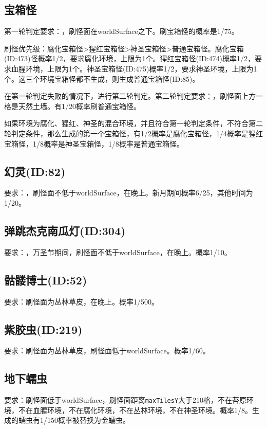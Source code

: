 \subsection{宝箱怪}
第一轮判定要求：，刷怪面在worldSurface之下。刷宝箱怪的概率是1/75。

刷怪优先级：腐化宝箱怪>猩红宝箱怪>神圣宝箱怪>普通宝箱怪。腐化宝箱(ID:473)怪概率1/2，要求腐化环境，上限为1个。猩红宝箱怪(ID:474)概率1/2，要求血腥环境，上限为1个。神圣宝箱怪(ID:475)概率1/2，要求神圣环境，上限为1个。这三个环境宝箱怪都不生成，则生成普通宝箱怪(ID:85)。

在第一轮判定失败的情况下，进行第二轮判定。第二轮判定要求：，刷怪面上方一格是天然土墙。有1/20概率刷普通宝箱怪。

\begin{remark}
如果环境为腐化、猩红、神圣的混合环境，并且符合第一轮判定条件，不符合第二轮判定条件，那么生成的第一个宝箱怪，有1/2概率是腐化宝箱怪，1/4概率是猩红宝箱怪，1/8概率是神圣宝箱怪，1/8概率是普通宝箱怪。
\end{remark}

\subsection{幻灵(ID:82)}
要求：，刷怪面不低于worldSurface，在晚上。新月期间概率6/25，其他时间为1/20。

\subsection{弹跳杰克南瓜灯(ID:304)}
要求：，万圣节期间，刷怪面不低于worldSurface，在晚上。概率1/10。

\subsection{骷髅博士(ID:52)}
要求：刷怪面为丛林草皮，在晚上。概率1/500。

\subsection{紫胶虫(ID:219)}
要求：刷怪面为丛林草皮，刷怪面低于worldSurface。概率1/60。

\subsection{地下蠕虫}
要求：刷怪面低于worldSurface，刷怪面距离\lstinline{maxTilesY}大于210格，不在苔原环境，不在血腥环境，不在腐化环境，不在丛林环境，不在神圣环境。概率1/8。生成的蠕虫有1/150概率被替换为金蠕虫。

